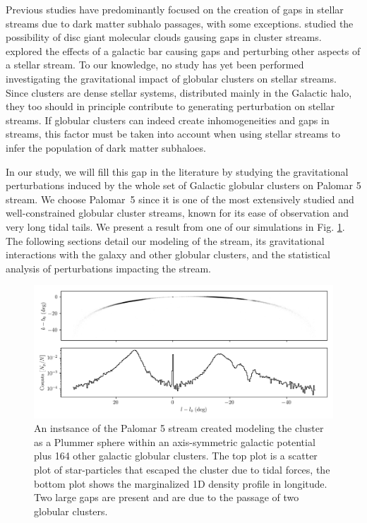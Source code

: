 \documentclass[draft]{aa}
\begin{document}
  Previous studies have predominantly focused on the creation of gaps in stellar streams due to dark matter subhalo passages, with some exceptions. \citet{2016MNRAS.463L..17A} studied the possibility of disc giant molecular clouds gausing gaps in cluster streams. \citet{2017NatAs...1..633P} explored the effects of a galactic bar causing gaps and perturbing other aspects of a stellar stream. To our knowledge, no study has yet been performed investigating the gravitational impact of globular clusters on stellar streams. Since clusters are dense stellar systems, distributed mainly in the Galactic halo, they too should in principle contribute to generating perturbation on stellar streams. If globular clusters can indeed create inhomogeneities and gaps in streams, this factor must be taken into account when using stellar streams to infer the population of dark matter subhaloes. 
  
  In our study, we will fill this gap in the literature by studying the gravitational perturbations induced by the whole set of Galactic globular clusters on Palomar 5 stream. We choose Palomar~5 since it is one of the most extensively studied and well-constrained globular cluster streams, known for its ease of observation and very long tidal tails. We present a result from one of our simulations in Fig. \ref{fig:stream_on_sky}. The following sections detail our modeling of the stream, its gravitational interactions with the galaxy and other globular clusters, and the statistical analysis of perturbations impacting the stream.



  \begin{figure}
    \centering
    \includegraphics[width=\linewidth]{stream_on_sky_Pal5_monte-carlo-009_pouliasis2017pii-GCNBody.png}
    \caption{An instsance of the Palomar 5 stream created modeling the cluster as a Plummer sphere within an axis-symmetric galactic potential plus 164 other galactic globular clusters. The top plot is a scatter plot of star-particles that escaped the cluster due to tidal forces, the bottom plot shows the marginalized 1D density profile in longitude. Two large gaps are present and are due to the passage of two globular clusters.}
    \label{fig:stream_on_sky}
    \end{figure}
\end{document}
